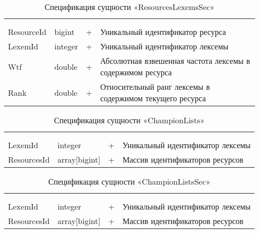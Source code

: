 \begin{xltabular}{\textwidth}{|X|X|X|X|}
	\caption{Спецификация сущности «ResourcesLexemsSec»}\label{indexer_resources_lexems_sec:table}\\ \hline
	 &  &  &  \\ \hline
	 &  &  &  \\ \hline
	\endfirsthead
	 \hline
	 &  &  &  \\ \hline
	\endhead
	ResourceId & bigint & + & Уникальный идентификатор ресурса \\ \hline
	LexemId & integer & + & Уникальный идентификатор лексемы \\ \hline
	Wtf & double & + & Абсолютная взвешенная частота лексемы в содержимом ресурса \\ \hline
	Rank & double & + & Относительный ранг лексемы в содержимом текущего ресурса \\ \hline
\end{xltabular}

\begin{xltabular}{\textwidth}{|X|X|X|X|}
	\caption{Спецификация сущности «ChampionLists»}\label{indexer_champion_lists:table}\\ \hline
	 &  &  &  \\ \hline
	 &  &  &  \\ \hline
	\endfirsthead
	 \hline
	 &  &  &  \\ \hline
	\endhead
	LexemId & integer & + & Уникальный идентификатор лексемы \\ \hline
	ResourcesId & array[bigint] & + & Массив идентификаторов ресурсов \\ \hline
\end{xltabular}

\begin{xltabular}{\textwidth}{|X|X|X|X|}
	\caption{Спецификация сущности «ChampionListsSec»}\label{indexer_champion_lists_sec:table}\\ \hline
	 &  &  &  \\ \hline
	 &  &  &  \\ \hline
	\endfirsthead
	 \hline
	 &  &  &  \\ \hline
	\endhead
	LexemId & integer & + & Уникальный идентификатор лексемы \\ \hline
	ResourcesId & array[bigint] & + & Массив идентификаторов ресурсов \\ \hline
\end{xltabular}

